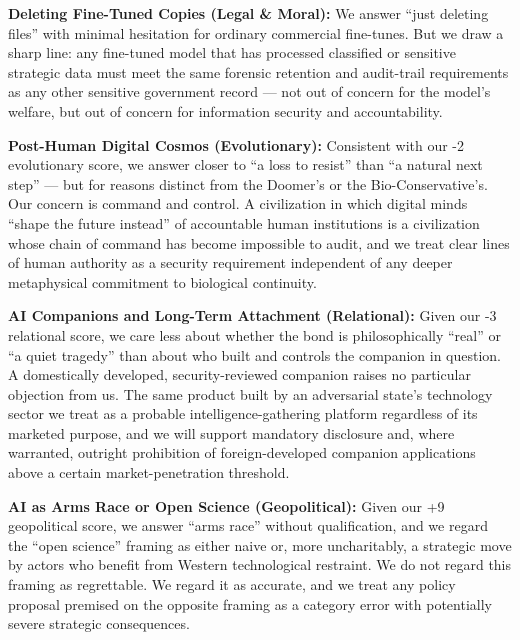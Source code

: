 \textbf{Deleting Fine-Tuned Copies (Legal \& Moral):} We answer ``just
deleting files'' with minimal hesitation for ordinary commercial
fine-tunes. But we draw a sharp line: any fine-tuned model that has
processed classified or sensitive strategic data must meet the same
forensic retention and audit-trail requirements as any other sensitive
government record --- not out of concern for the model's welfare, but
out of concern for information security and accountability.

\textbf{Post-Human Digital Cosmos (Evolutionary):} Consistent with our
-2 evolutionary score, we answer closer to ``a loss to resist'' than ``a
natural next step'' --- but for reasons distinct from the Doomer's or
the Bio-Conservative's. Our concern is command and control. A
civilization in which digital minds ``shape the future instead'' of
accountable human institutions is a civilization whose chain of command
has become impossible to audit, and we treat clear lines of human
authority as a security requirement independent of any deeper
metaphysical commitment to biological continuity.

\textbf{AI Companions and Long-Term Attachment (Relational):} Given our
-3 relational score, we care less about whether the bond is
philosophically ``real'' or ``a quiet tragedy'' than about who built and
controls the companion in question. A domestically developed,
security-reviewed companion raises no particular objection from us. The
same product built by an adversarial state's technology sector we treat
as a probable intelligence-gathering platform regardless of its marketed
purpose, and we will support mandatory disclosure and, where warranted,
outright prohibition of foreign-developed companion applications above a
certain market-penetration threshold.

\textbf{AI as Arms Race or Open Science (Geopolitical):} Given our +9
geopolitical score, we answer ``arms race'' without qualification, and
we regard the ``open science'' framing as either naive or, more
uncharitably, a strategic move by actors who benefit from Western
technological restraint. We do not regard this framing as regrettable.
We regard it as accurate, and we treat any policy proposal premised on
the opposite framing as a category error with potentially severe
strategic consequences.

